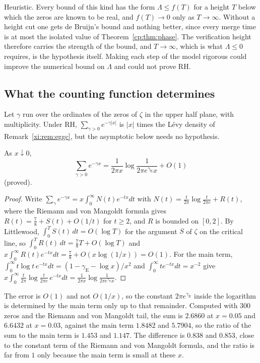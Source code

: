 \begin{remark}\label{xi:rem:nogo}
Heuristic. Every bound of this kind has the form $\Lambda\le f(T)$ for a height $T$ below which the zeros are known to be real, and $f(T)\to0$ only as $T\to\infty$. Without a height cut one gets de Bruijn's bound and nothing better, since every merge time is at most the isolated value of Theorem~\ref{cp:thm:phase}. The verification height therefore carries the strength of the bound, and $T\to\infty$, which is what $\Lambda\le0$ requires, is the hypothesis itself. Making each step of the model rigorous could improve the numerical bound on $\Lambda$ and could not prove RH.
\end{remark}

\subsection{What the counting function determines}\label{xi:sec:counting}

Let $\gamma$ run over the ordinates of the zeros of $\zeta$ in the upper half plane, with multiplicity. Under RH, $\sum_{\gamma>0}e^{-\gamma|x|}$ is $|x|$ times the L\'evy density of Remark~\ref{xi:rem:eggc}, but the asymptotic below needs no hypothesis.

\begin{proposition}\label{xi:prop:levyasym}
As $x\downarrow0$,
\[
\sum_{\gamma>0}e^{-\gamma x}=\frac1{2\pi x}\log\frac1{2\pi e^{\gamma_{\mathrm E}}x}+O(1)
\]
(proved).
\end{proposition}

\begin{proof}
Write $\sum_\gamma e^{-\gamma x}=x\int_0^\infty N(t)e^{-tx}dt$ with $N(t)=\frac t{2\pi}\log\frac t{2\pi e}+R(t)$, where the Riemann and von Mangoldt formula gives $R(t)=\frac78+S(t)+O(1/t)$ for $t\ge2$, and $R$ is bounded on $[0,2]$. By Littlewood, $\int_0^TS(t)\,dt=O(\log T)$ for the argument $S$ of $\zeta$ on the critical line, so $\int_0^TR(t)\,dt=\frac78T+O(\log T)$ and $x\int_0^\infty R(t)e^{-tx}dt=\frac78+O(x\log(1/x))=O(1)$. For the main term, $\int_0^\infty t\log t\,e^{-tx}dt=(1-\gamma_{\mathrm E}-\log x)/x^2$ and $\int_0^\infty te^{-tx}dt=x^{-2}$ give $x\int_0^\infty\frac t{2\pi}\log\frac t{2\pi e}\,e^{-tx}dt=\frac1{2\pi x}\log\frac1{2\pi e^{\gamma_{\mathrm E}}x}$.
\end{proof}

The error is $O(1)$ and not $O(1/x)$, so the constant $2\pi e^{\gamma_{\mathrm E}}$ inside the logarithm is determined by the main term only up to that remainder. Computed with $300$ zeros and the Riemann and von Mangoldt tail, the sum is $2.6860$ at $x=0.05$ and $6.6432$ at $x=0.03$, against the main term $1.8482$ and $5.7904$, so the ratio of the sum to the main term is $1.453$ and $1.147$. The difference is $0.838$ and $0.853$, close to the constant term of the Riemann and von Mangoldt formula, and the ratio is far from $1$ only because the main term is small at these $x$.

